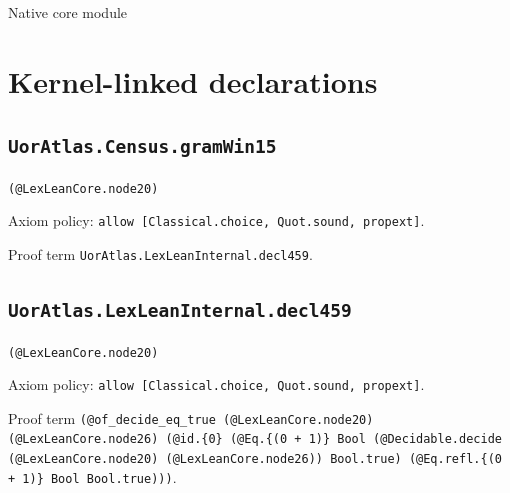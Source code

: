\documentclass[11pt]{article}
\begin{document}
\begin{center}{\LARGE Native core module}\end{center}
\section*{Kernel-linked declarations}
\subsection*{\texttt{UorAtlas.Census.gramWin15}}
\noindent\texttt{(@LexLeanCore.node20)}\par
\noindent Axiom policy: \texttt{allow [Classical.choice, Quot.sound, propext]}.\par
\noindent Proof term \texttt{UorAtlas.LexLeanInternal.decl459}.\par
\subsection*{\texttt{UorAtlas.LexLeanInternal.decl459}}
\noindent\texttt{(@LexLeanCore.node20)}\par
\noindent Axiom policy: \texttt{allow [Classical.choice, Quot.sound, propext]}.\par
\noindent Proof term \texttt{(@of\_decide\_eq\_true (@LexLeanCore.node20) (@LexLeanCore.node26) (@id.\{0\} (@Eq.\{(0 + 1)\} Bool (@Decidable.decide (@LexLeanCore.node20) (@LexLeanCore.node26)) Bool.true) (@Eq.refl.\{(0 + 1)\} Bool Bool.true)))}.\par
\end{document}
